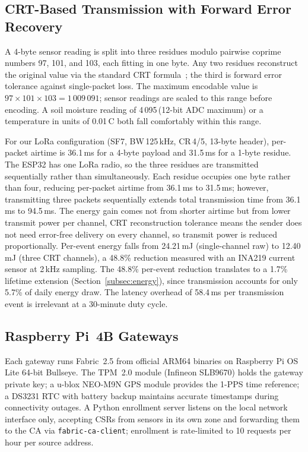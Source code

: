 \documentclass[a4paper,fleqn]{cas-dc}
\begin{document}
\subsection{CRT-Based Transmission with Forward Error Recovery}
\label{subsec:crt}

A 4-byte sensor reading is split into three residues modulo pairwise
coprime numbers 97, 101, and 103, each fitting in one byte. Any two
residues reconstruct the original value via the standard CRT
formula~\cite{garner1959residue}; the third is forward error tolerance
against single-packet loss. The maximum encodable value is
$97 \times 101 \times 103 = 1\,009\,091$; sensor readings are scaled
to this range before encoding. A soil moisture reading of
4\,095\,(12-bit ADC maximum) or a temperature in units of 0.01\,\textdegree{}C
both fall comfortably within this range.

For our LoRa configuration (SF7, BW\,125\,kHz, CR\,4/5, 13-byte
header), per-packet airtime is 36.1\,ms for a 4-byte payload and
31.5\,ms for a 1-byte residue. The ESP32 has one LoRa radio, so the
three residues are transmitted sequentially rather than simultaneously.
Each residue occupies one byte rather than four, reducing per-packet
airtime from 36.1\,ms to 31.5\,ms; however, transmitting three packets
sequentially extends total transmission time from 36.1\,ms to
94.5\,ms. The energy gain comes not from shorter airtime but from lower
transmit power per channel, CRT reconstruction tolerance means the
sender does not need error-free delivery on every channel, so transmit
power is reduced proportionally. Per-event energy falls from 24.21\,mJ
(single-channel raw) to 12.40\,mJ (three CRT channels), a 48.8\%
reduction measured with an INA219 current sensor at 2\,kHz sampling.
The 48.8\% per-event reduction translates to a 1.7\% lifetime
extension (Section~\ref{subsec:energy}), since transmission accounts
for only 5.7\% of daily energy draw.
The latency overhead of 58.4\,ms per transmission event is irrelevant
at a 30-minute duty cycle.

\subsection{Raspberry Pi~4B Gateways}
\label{subsec:gateways}

Each gateway runs Fabric~2.5 from official ARM64 binaries on Raspberry
Pi OS Lite 64-bit Bullseye. The TPM~2.0 module (Infineon SLB9670)
holds the gateway private key; a u-blox NEO-M9N GPS module provides
the 1-PPS time reference; a DS3231 RTC with battery backup maintains
accurate timestamps during connectivity outages. A Python enrollment
server listens on the local network interface only, accepting CSRs from
sensors in its own zone and forwarding them to the CA via
\texttt{fabric-ca-client}; enrollment is rate-limited to 10 requests
per hour per source address.
\end{document}
